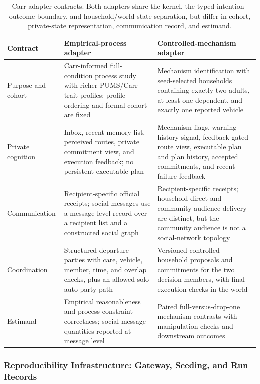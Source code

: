 \documentclass[journal]{IEEEtran}
\begin{document}
\begin{table}[tp]
\centering
\scriptsize
\renewcommand{\arraystretch}{0.85}
\setlength{\tabcolsep}{3pt}
\caption{Carr adapter contracts. Both adapters share the kernel, the typed
intention--outcome boundary, and household/world state separation, but differ
in cohort, private-state representation, communication record, and estimand.}
\label{tab:adapter-contracts}
\begin{tabularx}{\textwidth}{@{}p{}Y Y@{}}
\toprule
Contract & Empirical-process adapter & Controlled-mechanism adapter \\
\midrule
Purpose and cohort & Carr-informed full-condition process study with richer
PUMS/Carr trait profiles; profile ordering and formal cohort are fixed &
Mechanism identification with seed-selected households containing exactly two
adults, at least one dependent, and exactly one reported vehicle \\
Private cognition & Inbox, recent memory list, perceived routes, private
commitment view, and execution feedback; no persistent executable plan &
Mechanism flags, warning-history signal, feedback-gated route view, executable
plan and plan history, accepted commitments, and recent failure feedback \\
Communication & Recipient-specific official receipts; social messages use a
message-level record over a recipient list and a constructed social graph &
Recipient-specific receipts; household direct and community-audience delivery
are distinct, but the community audience is not a social-network topology \\
Coordination & Structured departure parties with care, vehicle, member, time,
and overlap checks, plus an allowed solo auto-party path & Versioned controlled
household proposals and commitments for the two decision members, with final
execution checks in the world \\
Estimand & Empirical reasonableness and process-constraint correctness;
social-message quantities reported at message level & Paired full-versus-drop-one
mechanism contrasts with manipulation checks and downstream outcomes \\
\bottomrule
\end{tabularx}
\end{table}

\subsubsection{Reproducibility Infrastructure: Gateway, Seeding, and Run Records}
\label{sec:gateway}
\end{document}
